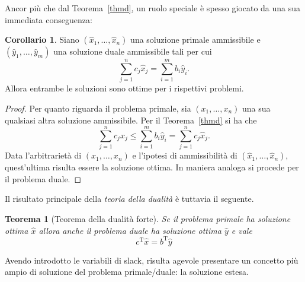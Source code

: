 \documentclass{article}[10pt]
\theoremstyle{theorem}
\newtheorem{theorem}{Teorema}[section]
\theoremstyle{definition}
\theoremstyle{definition}
\theoremstyle{definition}
\newtheorem{corollario}{Corollario}[section]
\begin{document}
	Ancor pi\`u che dal Teorema~\ref{thmd},
        un ruolo speciale \`e spesso giocato da una sua immediata conseguenza:
	
	\begin{corollario} \label{cor}
		Siano $(\hat{x}_1,\ldots,\hat{x}_n)$ una soluzione primale ammissibile e $(\hat{y}_1,\ldots,\hat{y}_m)$ una soluzione duale ammissibile tali per cui
		\begin{equation*}
			\sum_{j=1}^{n}c_j\hat{x}_j = \sum_{i=1}^{m}b_i\hat{y}_i.
		\end{equation*}
		Allora entrambe le soluzioni sono ottime per i rispettivi problemi.
	\end{corollario}
	\begin{proof}
		Per quanto riguarda il problema primale, sia $(x_1,\ldots,x_n)$ una sua qualsiasi altra soluzione ammissibile. Per il Teorema~\ref{thmd} si ha che
		\begin{equation*}
		\sum_{j=1}^{n}c_jx_j \leq \sum_{i=1}^{m}b_i\hat{y}_i = \sum_{j=1}^{n}c_j\hat{x}_j.
		\end{equation*}	
		Data l'arbitrarietà di $(x_1,\ldots,x_n)$ e l'ipotesi di ammissibilità di $(\hat{x}_1,\ldots,\hat{x}_n)$, quest'ultima risulta essere la soluzione ottima. In maniera analoga si procede per il problema duale.	
	\end{proof}

        Il risultato principale della \emph{teoria della dualit\`a} \`e tuttavia il seguente.
	 \begin{theorem}[Teorema della dualità forte] \label{thmf}
	 	Se il problema primale ha soluzione ottima $\hat{x}$ allora anche il problema duale ha soluzione ottima $\hat{y}$ e vale
	 	\begin{equation*}
	 	c^\mathrm{T}\hat{x}=b^\mathrm{T}\hat{y}
	 	\end{equation*} 
	 \end{theorem}

	
	Avendo introdotto le variabili di slack, risulta agevole presentare un concetto più ampio di soluzione del problema primale/duale: la soluzione estesa.
	
\end{document}

